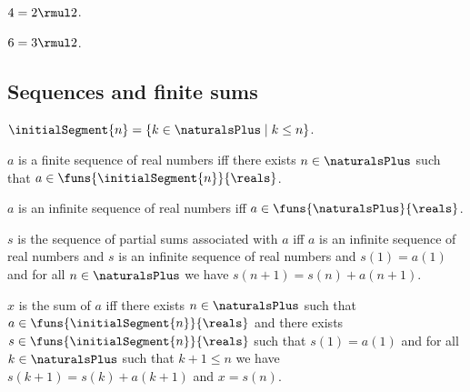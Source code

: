 \begin{lemma} \label{lemma_4_eq_2_times_2}
    $4 = 2 \rmul 2$.
\end{lemma}    

\begin{lemma} \label{lemma_6_eq_3_times_2}
    $6 = 3 \rmul 2$.
\end{lemma}    

\subsection{Sequences and finite sums}

\begin{definition}\label{initial_segment_naturalsplus}
    $\initialSegment{n} = \{k\in\naturalsPlus \mid k \leq n\}$.
\end{definition}

\begin{definition}\label{finite_real_sequence}
    $a$ is a finite sequence of real numbers iff
    there exists $n\in\naturalsPlus$ such that
    $a\in\funs{\initialSegment{n}}{\reals}$.
\end{definition}

\begin{definition}\label{infinite_real_sequence}
    $a$ is an infinite sequence of real numbers iff
    $a\in\funs{\naturalsPlus}{\reals}$.
\end{definition}

\begin{definition}\label{partial_sums_sequence}
    $s$ is the sequence of partial sums associated with $a$ iff
    $a$ is an infinite sequence of real numbers and
    $s$ is an infinite sequence of real numbers and
    $s(1) = a(1)$ and
    for all $n\in\naturalsPlus$ we have
    $s(n + 1) = s(n) + a(n + 1)$.
\end{definition}

\begin{definition}\label{sum_of_finite_sequence}
    $x$ is the sum of $a$ iff
    there exists $n\in\naturalsPlus$ such that
    $a\in\funs{\initialSegment{n}}{\reals}$ and
    there exists $s\in\funs{\initialSegment{n}}{\reals}$ such that
    $s(1) = a(1)$ and
    for all $k\in\naturalsPlus$ such that $k + 1 \leq n$ we have
    $s(k + 1) = s(k) + a(k + 1)$ and
    $x = s(n)$.
\end{definition}


